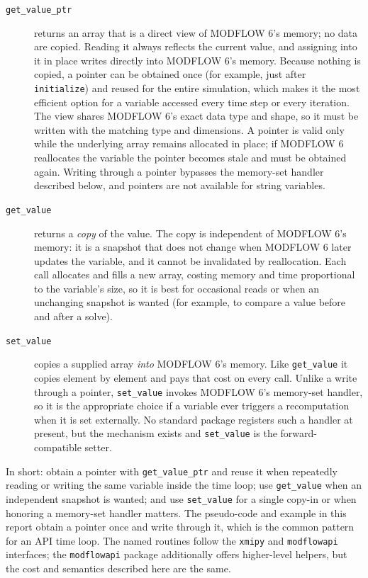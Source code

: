 \begin{description}
\item[\texttt{get\_value\_ptr}] returns an array that is a direct view of
MODFLOW 6's memory; no data are copied. Reading it always reflects the current
value, and assigning into it in place writes directly into MODFLOW 6's memory.
Because nothing is copied, a pointer can be obtained once (for example, just
after \texttt{initialize}) and reused for the entire simulation, which makes it
the most efficient option for a variable accessed every time step or every
iteration. The view shares MODFLOW 6's exact data type and shape, so it must be
written with the matching type and dimensions. A pointer is valid only while the
underlying array remains allocated in place; if MODFLOW 6 reallocates the
variable the pointer becomes stale and must be obtained again. Writing through a
pointer bypasses the memory-set handler described below, and pointers are not
available for string variables.

\item[\texttt{get\_value}] returns a \emph{copy} of the value. The copy is
independent of MODFLOW 6's memory: it is a snapshot that does not change when
MODFLOW 6 later updates the variable, and it cannot be invalidated by
reallocation. Each call allocates and fills a new array, costing memory and time
proportional to the variable's size, so it is best for occasional reads or when
an unchanging snapshot is wanted (for example, to compare a value before and
after a solve).

\item[\texttt{set\_value}] copies a supplied array \emph{into} MODFLOW 6's
memory. Like \texttt{get\_value} it copies element by element and pays that cost
on every call. Unlike a write through a pointer, \texttt{set\_value} invokes
MODFLOW 6's memory-set handler, so it is the appropriate choice if a variable
ever triggers a recomputation when it is set externally. No standard package
registers such a handler at present, but the mechanism exists and
\texttt{set\_value} is the forward-compatible setter.
\end{description}

\noindent In short: obtain a pointer with \texttt{get\_value\_ptr} and reuse it
when repeatedly reading or writing the same variable inside the time loop; use
\texttt{get\_value} when an independent snapshot is wanted; and use
\texttt{set\_value} for a single copy-in or when honoring a memory-set handler
matters. The pseudo-code and example in this report obtain a pointer once and
write through it, which is the common pattern for an API time loop. The named
routines follow the \texttt{xmipy} and \texttt{modflowapi} interfaces; the
\texttt{modflowapi} package additionally offers higher-level helpers, but the
cost and semantics described here are the same.

